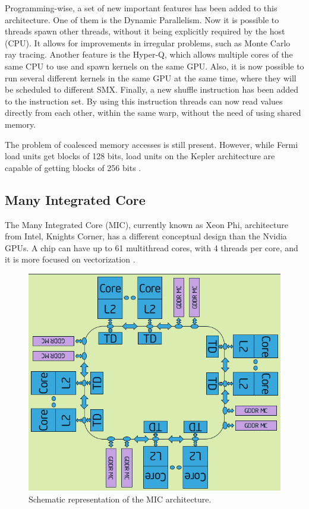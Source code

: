 Programming-wise, a set of new important features has been added to this architecture. One of them is the Dynamic Parallelism. Now it is possible to \cuda threads spawn other threads, without it being explicitly required by the host (CPU). It allows for improvements in irregular problems, such as Monte Carlo ray tracing. Another feature is the Hyper-Q, which allows multiple cores of the same CPU to use and spawn kernels on the same GPU. Also, it is now possible to run several different kernels in the same GPU at the same time, where they will be scheduled to different SMX. Finally, a new shuffle instruction has been added to the instruction set. By using this instruction \cuda threads can now read values directly from each other, within the same warp, without the need of using shared memory.

The problem of coalesced memory accesses is still present. However, while Fermi load units get blocks of 128 bits, load units on the Kepler architecture are capable of getting blocks of 256 bits \cite{NVIDIA:Kepler}.

\subsection{\intel Many Integrated Core}

The \intel Many Integrated Core (MIC), currently known as \intel Xeon Phi, architecture from Intel, Knights Corner, has a different conceptual design than the Nvidia GPUs. A chip can have up to 61 multithread cores, with 4 threads per core, and it is more focused on vectorization \cite{Intel:MIC:Elgar}. 

\begin{figure}[!htp]
	\begin{center}
		\includegraphics[scale=0.5]{../../common/img/mic_arch.png}
		\caption{Schematic representation of the \intel MIC architecture.}
		\label{fig:mic}
	\end{center}
\end{figure}

